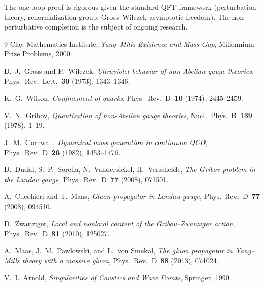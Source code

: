 \documentclass[11pt]{article}
\theoremstyle{definition}
\theoremstyle{remark}
\begin{document}
The one-loop proof is rigorous given the standard QFT framework
(perturbation theory, renormalization group, Gross--Wilczek
asymptotic freedom). The non-perturbative completion is the subject
of ongoing research.

\begin{thebibliography}{9}
  Clay Mathematics Institute, {\em Yang--Mills Existence and Mass
  Gap}, Millennium Prize Problems, 2000.

  D.~J.~Gross and F.~Wilczek, {\em Ultraviolet behavior of
  non-Abelian gauge theories}, Phys.~Rev.~Lett.~\textbf{30} (1973),
  1343--1346.

  K.~G.~Wilson, {\em Confinement of quarks}, Phys.~Rev.~D~\textbf{10}
  (1974), 2445--2459.

  V.~N.~Gribov, {\em Quantization of non-Abelian gauge theories},
  Nucl.~Phys.~B~\textbf{139} (1978), 1--19.

  J.~M.~Cornwall, {\em Dynamical mass generation in continuum QCD},
  Phys.~Rev.~D~\textbf{26} (1982), 1453--1476.

  D.~Dudal, S.~P.~Sorella, N.~Vandersickel, H.~Verschelde,
  {\em The Gribov problem in the Landau gauge}, Phys.~Rev.~D~\textbf{77}
  (2008), 071501.

  A.~Cucchieri and T.~Maas, {\em Gluon propagator in Landau gauge},
  Phys.~Rev.~D~\textbf{77} (2008), 094510.

  D.~Zwanziger, {\em Local and nonlocal content of the
  Gribov--Zwanziger action}, Phys.~Rev.~D~\textbf{81} (2010),
  125027.

  A.~Maas, J.~M.~Pawlowski, and L.~von Smekal, {\em The gluon
  propagator in Yang--Mills theory with a massive gluon}, Phys.~Rev.~D~\textbf{88}
  (2013), 074024.

  V.~I.~Arnold, {\em Singularities of Caustics and Wave Fronts},
  Springer, 1990.
\end{thebibliography}
\end{document}
